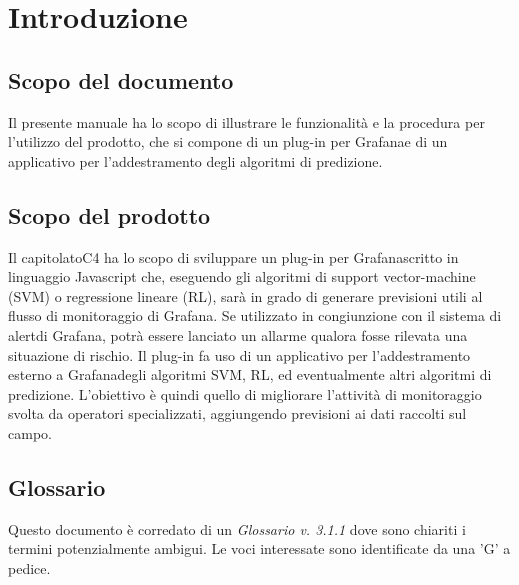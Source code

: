 \section{Introduzione}
	\subsection{Scopo del documento}
		Il presente manuale ha lo scopo di illustrare le funzionalità e la procedura per l'utilizzo del prodotto, che si compone di un plug-in per Grafana\glosp e di un applicativo per l'addestramento degli algoritmi di predizione.
	\subsection{Scopo del prodotto}
		Il capitolato\glosp C4 ha lo scopo di sviluppare un plug-in per Grafana\glosp scritto in linguaggio Javascript che, eseguendo gli algoritmi di support vector-machine (SVM\glo) o regressione lineare (RL\glo), sarà in grado di generare previsioni utili al flusso di monitoraggio di Grafana\glo. Se utilizzato in congiunzione con il sistema di alert\glosp di Grafana\glo, potrà essere lanciato un allarme qualora fosse rilevata una situazione di rischio.
		Il plug-in fa uso di un applicativo per l'addestramento esterno a Grafana\glosp degli algoritmi SVM\glosp, RL\glosp, ed eventualmente altri algoritmi di predizione. L'obiettivo è quindi quello di migliorare l'attività di monitoraggio svolta da operatori specializzati, aggiungendo previsioni ai dati raccolti sul campo.
	\subsection{Glossario}
		Questo documento è corredato di un \textit{Glossario v. 3.1.1} dove sono chiariti i termini potenzialmente ambigui. Le voci interessate sono identificate da una 'G' a pedice.
